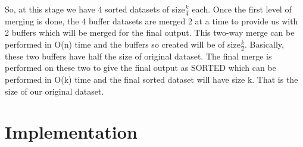 \documentclass[12pt]{article}
\begin{document}
\par
So, at this stage we have 4 sorted datasets of size\begin{math}\frac{k}{4}\end{math} each. Once the first level of merging is done, the 4 buffer datasets are merged 2 at a time to provide us with 2 buffers which will be merged for the final output. This two-way merge can be performed in O(n) time and the buffers so created will be of size\begin{math}\frac{k}{2}\end{math}.  Basically, these two buffers have half the size of original dataset. The final merge is performed on these two to give the final output as SORTED which can be performed in O(k) time and the final sorted dataset will have size k. That is the size of our original dataset.

\section{Implementation}
\end{document}
